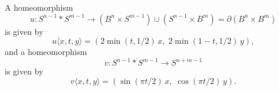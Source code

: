 A homeomorphism
$$u: S^{n-1} \ast S^{m-1} \rightarrow (B^n \times S^{m-1}) \cup (S^{n-1} \times B^m) = \partial(B^n \times B^m)$$
is given by
$$u\langle x,t,y\rangle = (2 \min(t,1/2)\,x,\; 2 \min(1-t,1/2)\,y),$$
and a homeomorphism
$$v: S^{n-1} \ast S^{m-1} \rightarrow S^{n+m-1}$$
is given by
$$v\langle x,t,y\rangle = (\sin(\pi t/2)\,x,\; \cos(\pi t/2)\,y).$$
